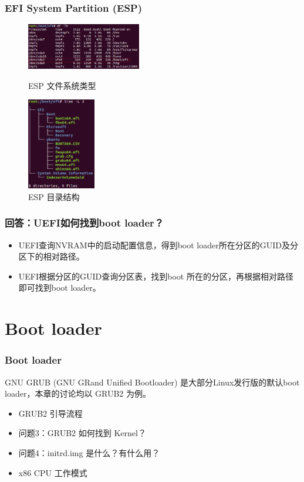 \documentclass{beamer}
\begin{document}
\begin{frame}
    \frametitle{EFI System Partition (ESP)}

    \begin{figure}[htbp]
    \centering
    \begin{minipage}[t]{0.48\textwidth}
    \centering
    \includegraphics[width=5cm]{images/efi_filesystem.png}
    \caption{ESP 文件系统类型}
    \end{minipage}
    \begin{minipage}[t]{0.48\textwidth}
    \centering
    \includegraphics[width=3cm]{images/efi_tree.png}
    \caption{ESP 目录结构}
    \end{minipage}
    \end{figure}
\end{frame}

\begin{frame}
    \frametitle{回答：UEFI如何找到boot loader？}
    \begin{itemize}
        \item UEFI查询NVRAM中的启动配置信息，得到boot loader所在分区的GUID及分区下的相对路径。
        \item UEFI根据分区的GUID查询分区表，找到boot 所在的分区，再根据相对路径即可找到boot loader。
    \end{itemize}
\end{frame}

\section{Boot loader}

\begin{frame}
    \frametitle{Boot loader}

    GNU GRUB (GNU  GRand Unified Bootloader) 是大部分Linux发行版的默认boot loader，本章的讨论均以 GRUB2 为例。
    \vfill{}

    \begin{itemize}
        \item GRUB2 引导流程
        \item 问题3：GRUB2 如何找到 Kernel？
        \item 问题4：initrd.img 是什么？有什么用？
        \item x86 CPU 工作模式
    \end{itemize}
\end{frame}
\end{document}
